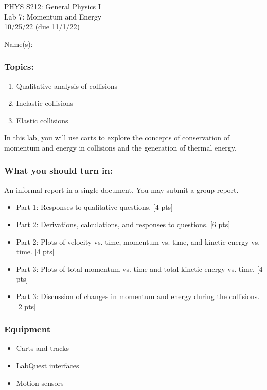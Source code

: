 \documentclass[11pt,letterpaper]{article}
\newcounter{question}[section]
\begin{document}
\setlength{\parindent}{0in}


\begin{flushright}
PHYS S212: General Physics I\\
Lab 7: Momentum and Energy\\
10/25/22 (due 11/1/22)
\end{flushright}

Name(s):\\


\subsubsection*{Topics:}
\begin{enumerate}
\setlength{\parskip}{3pt}
\item Qualitative analysis of collisions
\item Inelastic collisions
\item Elastic collisions
\end{enumerate}

In this lab, you will use carts to explore the concepts of conservation of momentum and energy in collisions and the generation of thermal energy.

\subsubsection*{What you should turn in:} 
An informal report in a single document. You may submit a group report.
\begin{itemize}
\setlength{\parskip}{3pt}
\item Part 1: Responses to qualitative questions. [4 pts]
\item Part 2: Derivations, calculations, and responses to questions. [6 pts]
\item Part 2: Plots of velocity vs. time, momentum vs. time, and kinetic energy vs. time. [4 pts]
\item Part 3: Plots of total momentum vs. time and total kinetic energy vs. time. [4 pts]
\item Part 3: Discussion of changes in momentum and energy during the collisions. [2 pts]
\end{itemize}

\subsubsection*{Equipment}
\begin{itemize}
\setlength{\parskip}{3pt}
\item Carts and tracks
\item LabQuest interfaces
\item Motion sensors
\end{itemize}
\end{document}
